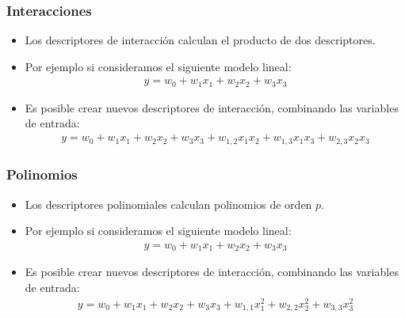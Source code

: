 \documentclass[aspectratio=169, 10pt]{beamer}
\begin{document}
\begin{frame}
\frametitle{Interacciones}
\begin{itemize}
	\item Los descriptores de interacci\'on calculan el producto de dos descriptores.
	\pause
	\item Por ejemplo si consideramos el siguiente modelo lineal:
	\begin{align}
	y=w_0+w_1 x_1 + w_2 x_2 + w_3 x_3 
	\end{align}
	\pause
	\item Es posible crear nuevos descriptores de interacci\'on, combinando las variables de entrada:
	\begin{align}
	y=w_0+w_1 x_1 + w_2 x_2 + w_3 x_3 + w_{1,2} x_1 x_2 + w_{1,3} x_1 x_3 + w_{2,3} x_2 x_3
	\end{align}	
	
\end{itemize}

\end{frame}

\begin{frame}
\frametitle{Polinomios}
\begin{itemize}
	\item Los descriptores polinomiales calculan polinomios de orden $p$.
	\pause
	\item Por ejemplo si consideramos el siguiente modelo lineal:
	\begin{align}
	y=w_0+w_1 x_1 + w_2 x_2 + w_3 x_3 
	\end{align}
	\pause
	\item Es posible crear nuevos descriptores de interacci\'on, combinando las variables de entrada:
	\begin{align}
	y=w_0+w_1 x_1 + w_2 x_2 + w_3 x_3 + w_{1,1} x_1^2 + w_{2,2} x_2^2 + w_{3,3} x_3^2
	\end{align}	
	
\end{itemize}

\end{frame}
\end{document}

